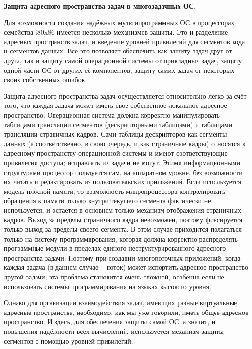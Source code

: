 \begin{center}{\bfseries Защита адресного пространства задач в многозадачных ОС.}
\end{center}

Для возможности создания надёжных мультипрограммных ОС в процессорах семейства i80x86 имеется несколько механизмов защиты. Это и разделение адресных пространств задач, и введение уровней привилегий для сегментов кода и сегментов данных. Все это позволяет обеспечить как защиту задач друг от друга, так и защиту самой операционной системы от прикладных задач, защиту одной части ОС от других её компонентов, защиту самих задач от некоторых своих собственных ошибок.

Защита адресного пространства задач осуществляется относительно легко за счёт того, что каждая задача может иметь свое собственное локальное адресное пространство. Операционная система должна корректно манипулировать таблицами трансляции сегментов (дескрипторными таблицами) и таблицами трансляции страничных кадров. Сами таблицы дескрипторов как сегменты данных (а соответственно, в свою очередь, и как страничные кадры) относятся к адресному пространству операционной системы и имеют соответствующие привилегии доступа; исправлять их задачи не могут. Этими информационными структурами процессор пользуется сам, на аппаратном уровне, без возможности их читать и редактировать из пользовательских приложений. Если используется модель плоской памяти, то возможность микропроцессора контролировать обращения к памяти только внутри текущего сегмента фактически не используется, и остается в основном только механизм отображения страничных кадров. Выход за пределы страничного кадра невозможен, поэтому фиксируется только выход за пределы своего сегмента. В этом случае приходится полагаться только на систему программирования, которая должна корректно распределять программные модули в пределах единого неструктурированного адресного пространства задачи. Поэтому при создании многопоточных приложений, когда каждая задача (в данном случае – поток) может испортить адресное пространство другой задачи, эта проблема становится очень сложной, особенно если не использовать системы программирования на языках высокого уровня.

Однако для организации взаимодействия задач, имеющих разные виртуальные адресные пространства, необходимо, как мы уже говорили, иметь общее адресное пространство. И здесь, для обеспечения защиты самой ОС, а значит, и повышения надёжности всех вычислений, используется механизм защиты сегментов с помощью уровней привилегий.

